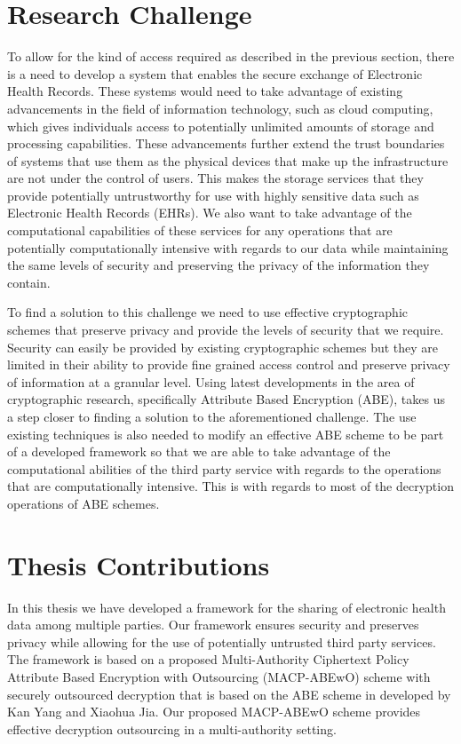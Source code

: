 \section{Research Challenge}

To allow for the kind of access required as described in the previous section, there is a need to develop a system that enables the secure exchange of Electronic Health Records. These systems would need to take advantage of existing advancements in the field of information technology, such as cloud computing, which gives individuals access to potentially unlimited amounts of storage and processing capabilities. These advancements further extend the trust boundaries of systems that use them as the physical devices that make up the infrastructure are not under the control of users. This makes the storage services that they provide potentially untrustworthy for use with highly sensitive data such as Electronic Health Records (EHRs). We also want to take advantage of the computational capabilities of these services for any operations that are potentially computationally intensive with regards to our data while maintaining the same levels of security and preserving the privacy of the information they contain.

To find a solution to this challenge we need to use effective cryptographic schemes that preserve privacy and provide the levels of security that we require. Security can easily be provided by existing cryptographic schemes but they are limited in their ability to provide fine grained access control and preserve privacy of information at a granular level. Using latest developments in the area of cryptographic research, specifically Attribute Based Encryption (ABE), takes us a step closer to finding a solution to the aforementioned challenge. The use existing techniques is also needed to modify an effective ABE scheme to be part of a developed framework so that we are able to take advantage of the computational abilities of the third party service with regards to the operations that are computationally intensive. This is with regards to most of the decryption operations of ABE schemes.

\section{Thesis Contributions}

In this thesis we have developed a framework for the sharing of electronic health data among multiple parties. Our framework ensures security and preserves privacy while allowing for the use of potentially untrusted third party services. The framework is based on a proposed Multi-Authority Ciphertext Policy Attribute Based Encryption with Outsourcing (MACP-ABEwO) scheme with securely outsourced decryption that is based on the ABE scheme in developed by Kan Yang and Xiaohua Jia\cite{Yang2014}. Our proposed MACP-ABEwO scheme provides effective decryption outsourcing in a multi-authority setting.

